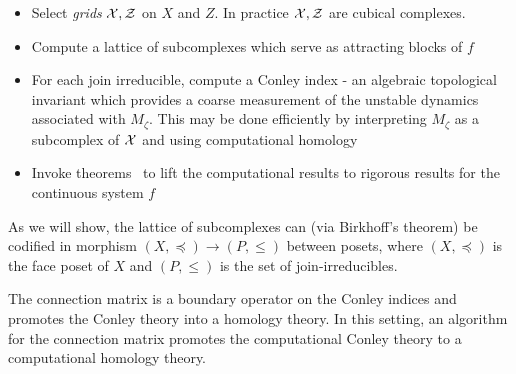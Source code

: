 \begin{itemize}
\item Select {\em grids} ${\mathcal X},{\mathcal Z}$ on $X$ and $Z$.  In practice ${\mathcal X},{\mathcal Z}$ are cubical complexes.
\item Compute a lattice of subcomplexes which serve as attracting blocks of $f$
\item For each join irreducible, compute a Conley index -  an algebraic topological invariant which provides a coarse measurement of the unstable dynamics associated with $M_\zeta$. This may be done efficiently by interpreting $M_\zeta$ as a subcomplex of ${\mathcal X}$ and using computational homology 
\item Invoke theorems~\cite{cmdb,cmdbchaos} to lift the computational results to rigorous results for the continuous system $f$ 

\end{itemize}

As we will show, the lattice of subcomplexes can (via Birkhoff's theorem) be codified in morphism $(X,\preceq)\to (P,\leq)$ between posets, where $(X,\preceq)$ is the face poset of $X$ and $(P,\leq)$ is the set of join-irreducibles.


The connection matrix is a boundary operator on the Conley indices and promotes the Conley theory into a homology theory.  In this setting, an algorithm for the connection matrix promotes the computational Conley theory to a computational homology theory.




